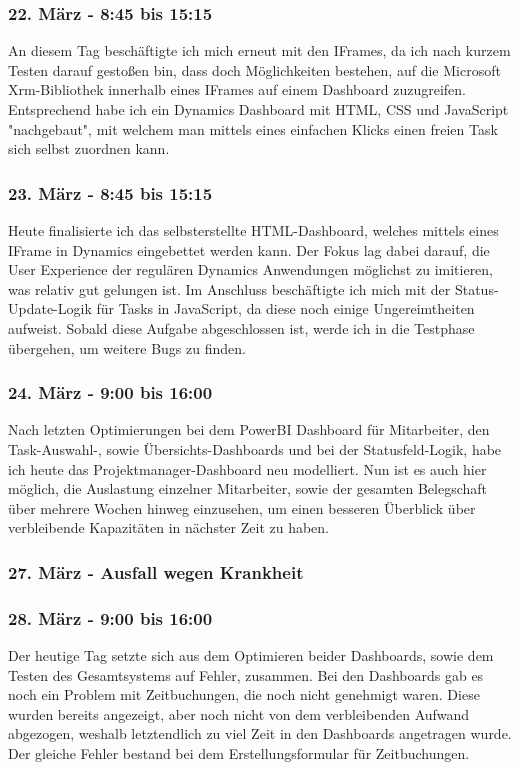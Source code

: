 \subsubsection*{22. März - 8:45 bis 15:15}
An diesem Tag beschäftigte ich mich erneut mit den IFrames, da ich nach kurzem Testen darauf gestoßen bin, dass doch Möglichkeiten bestehen, auf die Microsoft Xrm-Bibliothek innerhalb eines IFrames auf einem Dashboard zuzugreifen. Entsprechend habe ich ein Dynamics Dashboard mit HTML, CSS und JavaScript "nachgebaut", mit welchem man mittels eines einfachen Klicks einen freien Task sich selbst zuordnen kann.

\subsubsection*{23. März - 8:45 bis 15:15} 
Heute finalisierte ich das selbsterstellte HTML-Dashboard, welches mittels eines IFrame in Dynamics eingebettet werden kann. Der Fokus lag dabei darauf, die User Experience der regulären Dynamics Anwendungen möglichst zu imitieren, was relativ gut gelungen ist. Im Anschluss beschäftigte ich mich mit der Status-Update-Logik für Tasks in JavaScript, da diese noch einige Ungereimtheiten aufweist. Sobald diese Aufgabe abgeschlossen ist, werde ich in die Testphase übergehen, um weitere Bugs zu finden.

\subsubsection*{24. März - 9:00 bis 16:00}
Nach letzten Optimierungen bei dem PowerBI Dashboard für Mitarbeiter, den Task-Auswahl-, sowie Übersichts-Dashboards und bei der Statusfeld-Logik, habe ich heute das Projektmanager-Dashboard neu modelliert. Nun ist es auch hier möglich, die Auslastung einzelner Mitarbeiter, sowie der gesamten Belegschaft über mehrere Wochen hinweg einzusehen, um einen besseren Überblick über verbleibende Kapazitäten in nächster Zeit zu haben.

\subsubsection*{27. März - Ausfall wegen Krankheit}

\subsubsection*{28. März - 9:00 bis 16:00}
Der heutige Tag setzte sich aus dem Optimieren beider Dashboards, sowie dem Testen des Gesamtsystems auf Fehler, zusammen. Bei den Dashboards gab es noch ein Problem mit Zeitbuchungen, die noch nicht genehmigt waren. Diese wurden bereits angezeigt, aber noch nicht von dem verbleibenden Aufwand abgezogen, weshalb letztendlich zu viel Zeit in den Dashboards angetragen wurde. Der gleiche Fehler bestand bei dem Erstellungsformular für Zeitbuchungen. 

